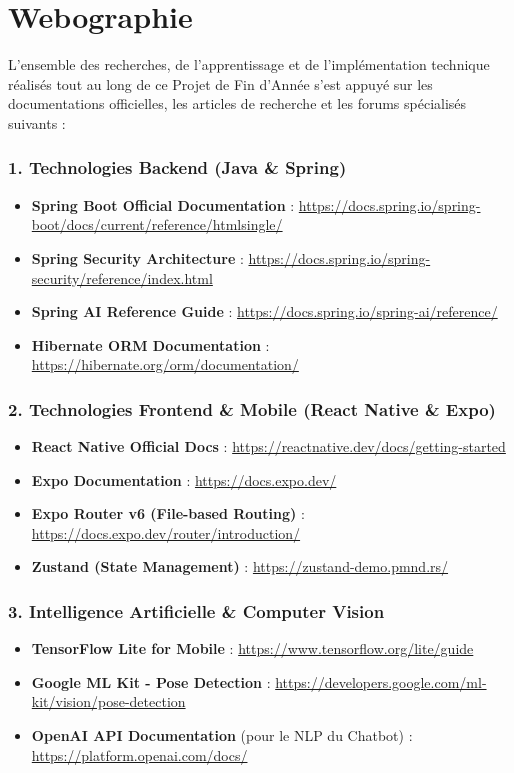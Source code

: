 \chapter*{Webographie}

L'ensemble des recherches, de l'apprentissage et de l'implémentation technique réalisés tout au long de ce Projet de Fin d'Année s'est appuyé sur les documentations officielles, les articles de recherche et les forums spécialisés suivants :

\vspace{0.5cm}

\subsection*{1. Technologies Backend (Java \& Spring)}
\begin{itemize}
    \item \textbf{Spring Boot Official Documentation} : \url{https://docs.spring.io/spring-boot/docs/current/reference/htmlsingle/}
    \item \textbf{Spring Security Architecture} : \url{https://docs.spring.io/spring-security/reference/index.html}
    \item \textbf{Spring AI Reference Guide} : \url{https://docs.spring.io/spring-ai/reference/}
    \item \textbf{Hibernate ORM Documentation} : \url{https://hibernate.org/orm/documentation/}
\end{itemize}

\subsection*{2. Technologies Frontend \& Mobile (React Native \& Expo)}
\begin{itemize}
    \item \textbf{React Native Official Docs} : \url{https://reactnative.dev/docs/getting-started}
    \item \textbf{Expo Documentation} : \url{https://docs.expo.dev/}
    \item \textbf{Expo Router v6 (File-based Routing)} : \url{https://docs.expo.dev/router/introduction/}
    \item \textbf{Zustand (State Management)} : \url{https://zustand-demo.pmnd.rs/}
\end{itemize}

\subsection*{3. Intelligence Artificielle \& Computer Vision}
\begin{itemize}
    \item \textbf{TensorFlow Lite for Mobile} : \url{https://www.tensorflow.org/lite/guide}
    \item \textbf{Google ML Kit - Pose Detection} : \url{https://developers.google.com/ml-kit/vision/pose-detection}
    \item \textbf{OpenAI API Documentation} (pour le NLP du Chatbot) : \url{https://platform.openai.com/docs/}
\end{itemize}

